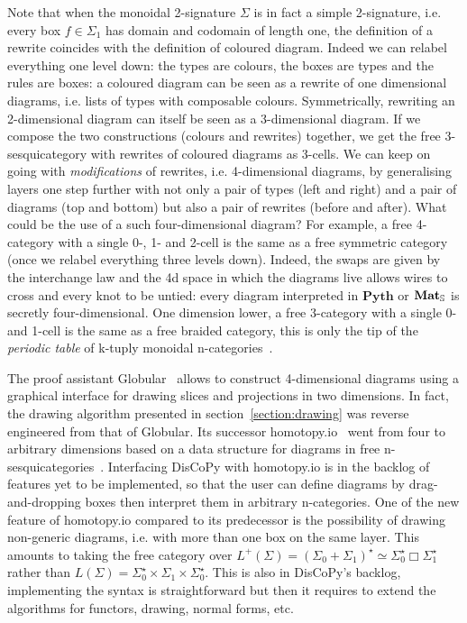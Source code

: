 Note that when the monoidal 2-signature $\Sigma$ is in fact a simple 2-signature, i.e. every box $f \in \Sigma_1$ has domain and codomain of length one, the definition of a rewrite coincides with the definition of coloured diagram.
Indeed we can relabel everything one level down: the types are colours, the boxes are types and the rules are boxes: a coloured diagram can be seen as a rewrite of one dimensional diagrams, i.e. lists of types with composable colours.
Symmetrically, rewriting an 2-dimensional diagram can itself be seen as a 3-dimensional diagram.
If we compose the two constructions (colours and rewrites) together, we get the free 3-sesquicategory with rewrites of coloured diagrams as 3-cells.
We can keep on going with \emph{modifications} of rewrites, i.e. 4-dimensional diagrams, by generalising layers one step further with not only a pair of types (left and right) and a pair of diagrams (top and bottom) but also a pair of rewrites (before and after).
What could be the use of a such four-dimensional diagram?
For example, a free 4-category with a single 0-, 1- and 2-cell is the same as a free symmetric category (once we relabel everything three levels down).
Indeed, the swaps are given by the interchange law and the 4d space in which the diagrams live allows wires to cross and every knot to be untied: every diagram interpreted in $\mathbf{Pyth}$ or $\mathbf{Mat}_\S$ is secretly four-dimensional.
One dimension lower, a free 3-category with a single 0- and 1-cell is the same as a free braided category, this is only the tip of the \emph{periodic table} of k-tuply monoidal n-categories~\cite[Section~2.5]{BaezStay10}.

The proof assistant Globular~\cite{BarEtAl18} allows to construct 4-dimensional diagrams using a graphical interface for drawing slices and projections in two dimensions.
In fact, the drawing algorithm presented in section~\ref{section:drawing} was reverse engineered from that of Globular.
Its successor homotopy.io~\cite{ReutterVicary19} went from four to arbitrary dimensions based on a data structure for diagrams in free n-sesquicategories~\cite{BarVicary17}.
Interfacing DisCoPy with homotopy.io is in the backlog of features yet to be implemented, so that the user can define diagrams by drag-and-dropping boxes then interpret them in arbitrary n-categories.
One of the new feature of homotopy.io compared to its predecessor is the possibility of drawing non-generic diagrams, i.e. with more than one box on the same layer.
This amounts to taking the free category over $L^+(\Sigma) = (\Sigma_0 + \Sigma_1)^\star \simeq \Sigma_0^\star \Box \Sigma_1^\star$ rather than $L(\Sigma) = \Sigma_0^\star \times \Sigma_1 \times \Sigma_0^\star$.
This is also in DisCoPy's backlog, implementing the syntax is straightforward but then it requires to extend the algorithms for functors, drawing, normal forms, etc.

